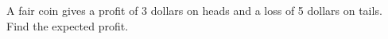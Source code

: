 A fair coin gives a profit of 3 dollars on heads and a loss of 5 dollars on tails. Find the expected profit.
